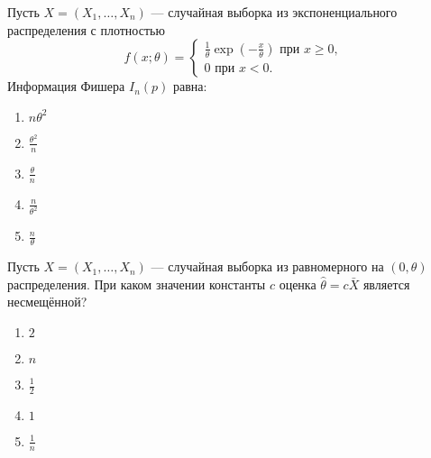\documentclass[t]{beamer}
\begin{document}
 \begin{frame} \label{41} 
\begin{block}{41} 

Пусть $X = (X_1, \ldots , X_n)$ — случайная выборка из экспоненциального распределения с плотностью
\[
f(x; \theta) =
\begin{cases}
\frac{1}{\theta}\exp(-\frac{x}{\theta}) \text{ при } x \geq 0,  \\
0 \text{ при } x < 0.
\end{cases}
\]
Информация Фишера $I_n(p)$ равна:
  


 \end{block} 
\begin{enumerate} 
\item[] \hyperlink{41-No}{\beamergotobutton{} $n \theta^2$}
\item[] \hyperlink{41-No}{\beamergotobutton{} $\frac{\theta^2}{n}$}
\item[] \hyperlink{41-No}{\beamergotobutton{} $\frac{\theta}{n}$}
\item[] \hyperlink{41-Yes}{\beamergotobutton{} $\frac{n}{\theta^2}$}
\item[] \hyperlink{41-No}{\beamergotobutton{} $\frac{n}{\theta}$}
\end{enumerate} 
\end{frame} 


 \begin{frame} \label{42} 
\begin{block}{42} 

Пусть $X = (X_1, \ldots , X_n)$ — случайная выборка из равномерного на $(0, \theta)$ распределения. При каком значении константы $c$ оценка  $\hat{\theta} = c \bar{X}$ является несмещённой?
  


 \end{block} 
\begin{enumerate} 
\item[] \hyperlink{42-Yes}{\beamergotobutton{} $2$}
\item[] \hyperlink{42-No}{\beamergotobutton{} $n$}
\item[] \hyperlink{42-No}{\beamergotobutton{} $\frac{1}{2}$}
\item[] \hyperlink{42-No}{\beamergotobutton{} $1$}
\item[] \hyperlink{42-No}{\beamergotobutton{} $\frac{1}{n}$}
\end{enumerate} 
\end{frame} 
\end{document}
